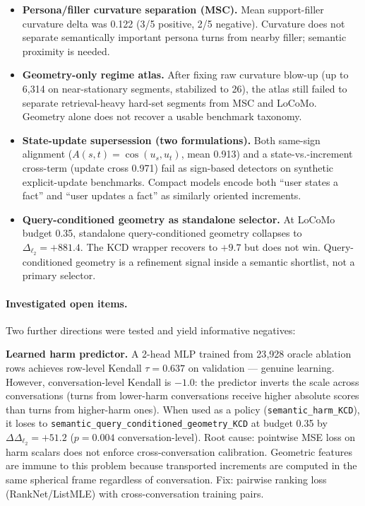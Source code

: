\documentclass[conference]{IEEEtran}
\newcommand{\Logit}{\Delta_{\ell_2}}
\begin{document}
\begin{itemize}[leftmargin=1.4em]
\item \textbf{Persona/filler curvature separation (MSC).} Mean support-filler
  curvature delta was 0.122 (3/5 positive, 2/5 negative). Curvature does not
  separate semantically important persona turns from nearby filler; semantic
  proximity is needed.
\item \textbf{Geometry-only regime atlas.} After fixing raw curvature blow-up
  (up to 6{,}314 on near-stationary segments, stabilized to 26), the atlas
  still failed to separate retrieval-heavy hard-set segments from MSC and
  LoCoMo. Geometry alone does not recover a usable benchmark taxonomy.
\item \textbf{State-update supersession (two formulations).} Both same-sign
  alignment ($A(s,t) = \cos(u_s, u_t)$, mean 0.913) and a state-vs.-increment
  cross-term (update cross 0.971) fail as sign-based detectors on synthetic
  explicit-update benchmarks. Compact models encode both ``user states a fact''
  and ``user updates a fact'' as similarly oriented increments.
\item \textbf{Query-conditioned geometry as standalone selector.} At LoCoMo
  budget 0.35, standalone query-conditioned geometry collapses to
  $\Logit{=}+881.4$. The KCD wrapper recovers to $+9.7$ but does not win.
  Query-conditioned geometry is a refinement signal inside a semantic shortlist,
  not a primary selector.
\end{itemize}

\paragraph{Investigated open items.}
Two further directions were tested and yield informative negatives:

\textbf{Learned harm predictor.}
A 2-head MLP trained from 23{,}928 oracle ablation rows achieves row-level
Kendall $\tau{=}0.637$ on validation --- genuine learning. However,
conversation-level Kendall is $-1.0$: the predictor inverts the scale across
conversations (turns from lower-harm conversations receive higher absolute
scores than turns from higher-harm ones). When used as a policy
(\texttt{semantic\_harm\_KCD}), it loses to
\texttt{semantic\_query\_conditioned\_geometry\_KCD} at budget 0.35 by
$\Delta\Logit{=}+51.2$ ($p{=}0.004$ conversation-level). Root cause: pointwise
MSE loss on harm scalars does not enforce cross-conversation calibration.
Geometric features are immune to this problem because transported increments
are computed in the same spherical frame regardless of conversation. Fix:
pairwise ranking loss (RankNet/ListMLE) with cross-conversation training pairs.
\end{document}
